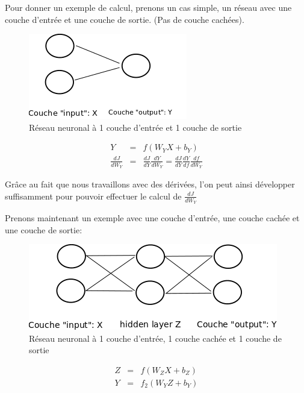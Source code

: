 \documentclass[11pt,a4paper]{report}
\begin{document}
    \par Pour donner un exemple de calcul, prenons un cas simple, un réseau avec une couche d'entrée et une couche de sortie. (Pas de couche cachées).
    
    \begin{figure}[!h]
    \center
    \includegraphics[scale=0.74]{ressources/nn_presentation_5.png}
    \caption{Réseau neuronal à 1 couche d'entrée et 1 couche de sortie}
    \end{figure} 
    
    \begin{eqnarray}
    Y &=& f(W_YX+b_Y) \\
    \frac{dJ}{dW_Y} &=& \frac{dJ}{dY} \frac{dY}{dW_Y} = \frac{dJ}{dY} \frac{dY}{df}\frac{df}{dW_Y}
    \end{eqnarray}
    
    \par Grâce au fait que nous travaillons avec des dérivées, l'on peut ainsi développer suffisamment pour pouvoir effectuer le calcul de $\frac{dJ}{dW_Y}$
    
    \par Prenons maintenant un exemple avec une couche d'entrée, une couche cachée et une couche de sortie: 
    
    \begin{figure}[!h]
    \center
    \includegraphics[scale=0.74]{ressources/nn_presentation_6.png}
    \caption{Réseau neuronal à 1 couche d'entrée, 1 couche cachée et 1 couche de sortie}
    \end{figure} 
    
    \begin{eqnarray}
    Z &=& f\left(W_ZX+b_Z\right) \\
    Y &=& f_2\left( W_YZ+b_Y \right) 
    \end{eqnarray}
    
\end{document}
